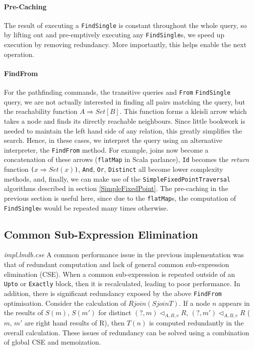 \documentclass[12pt,a4paper,twoside,openright]{report}
\newcommand\codeName[1]{\texttt{#1}}
\newcommand\note[1]{\textit{#1}}
\newcommand\mathName[1]{\textit{#1}}
\newcommand{\opRule}[3]{#1 \triangleleft_{#2, v} #3}
\begin{document}
		\paragraph{Pre-Caching}
		The result of executing a \codeName{FindSingle} is constant throughout the whole query, so by lifting out and pre-emptively executing any \codeName{FindSingle}s, we speed up execution by removing redundancy. More importantly, this helps enable the next operation.
		
		\paragraph{FindFrom}
		For the pathfinding commands, the transitive queries and \codeName{From} \codeName{FindSingle} query, we are not actually interested in finding all pairs matching the query, but the reachability function \codeName{$A \Rightarrow Set[B]$}. This function forms a kleisli arrow which takes a node and finds its directly reachable neighbours. Since little bookwork is needed to maintain the left hand side of any relation, this greatly simplifies the search. Hence, in these cases, we interpret the query using an alternative interpreter, the \codeName{FindFrom} method. For example, joins now become a concatenation of these arrows (\codeName{flatMap}  in Scala parlance), \codeName{Id} becomes the \mathName{return} function \codeName{($x \Rightarrow Set(x)$)}, \codeName{And}, \codeName{Or}, \codeName{Distinct} all become lower complexity methods, and, finally, we can make use of the \codeName{SimpleFixedPointTraversal} algorithms described in section \ref{SimpleFixedPoint}. The pre-caching in the previous section is useful here, since due to the \codeName{flatMap}s, the computation of \codeName{FindSingle}s would be repeated many times otherwise.

	\subsection{Common Sub-Expression Elimination}
	\note{impl.lmdb.cse}
	A common performance issue in the previous implementation was that of redundant computation and lack of general common sub-expression elimination (CSE). When a common sub-expression is repeated outside of an \codeName{Upto} or \codeName{Exactly} block, then it is recalculated, leading to poor performance. In addition, there is significant redundancy exposed by the above \codeName{FindFrom} optimisation. Consider the calculation of $R join (S join T)$. If a node $n$ appears in the results of $S(m)$, $S(m')$ for distinct $\opRule{(?, m)}{A, B}{R}$, $\opRule{(?, m')}{A, B}{R}$ ($m$, $m'$ are right hand results of R), then $T(n)$ is computed redundantly in the overall calculation. These issues of redundancy can be solved using a combination of global CSE and memoization.
\end{document}
